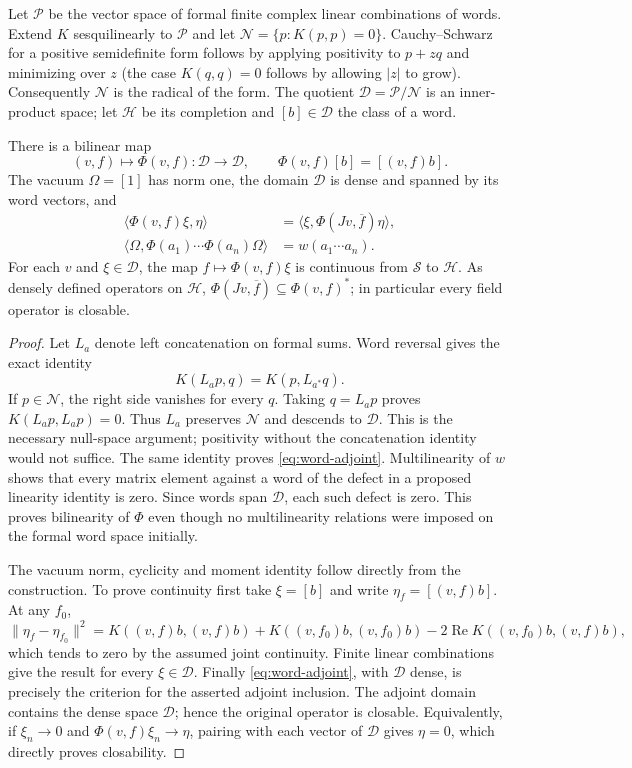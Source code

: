 Let $\mathcal P$ be the vector space of formal finite complex linear
combinations of words. Extend $K$ sesquilinearly to $\mathcal P$ and let
$\mathcal N=\{p:K(p,p)=0\}$. Cauchy--Schwarz for a positive semidefinite form
follows by applying positivity to $p+zq$ and minimizing over $z$ (the case
$K(q,q)=0$ follows by allowing $|z|$ to grow). Consequently
$\mathcal N$ is the radical of the form. The quotient
$\mathcal D=\mathcal P/\mathcal N$ is an inner-product space; let
$\mathcal H$ be its completion and $[b]\in\mathcal D$ the class of a word.

\begin{proposition}\label{prop:word-fields}
There is a bilinear map
\[
 (v,f)\longmapsto\Phi(v,f):\mathcal D\to\mathcal D,
 \qquad \Phi(v,f)[b]=[(v,f)b].
\]
The vacuum $\Omega=[1]$ has norm one, the domain $\mathcal D$ is dense and
spanned by its word vectors, and
\begin{align}
 \langle\Phi(v,f)\xi,\eta\rangle
   &=\langle\xi,\Phi(Jv,\overline f)\eta\rangle,
                       \label{eq:word-adjoint}\\
 \langle\Omega,\Phi(a_1)\cdots\Phi(a_n)\Omega\rangle
   &=w(a_1\cdots a_n).\nonumber
\end{align}
For each $v$ and $\xi\in\mathcal D$, the map
$f\mapsto\Phi(v,f)\xi$ is continuous from $\mathscr S$ to $\mathcal H$.
As densely defined operators on $\mathcal H$,
$\Phi(Jv,\overline f)\subseteq\Phi(v,f)^*$; in particular every field
operator is closable.
\end{proposition}
\begin{proof}
Let $L_a$ denote left concatenation on formal sums. Word reversal gives the
exact identity
\[
 K(L_ap,q)=K(p,L_{a^*}q).
\]
If $p\in\mathcal N$, the right side vanishes for every $q$. Taking
$q=L_ap$ proves $K(L_ap,L_ap)=0$. Thus $L_a$ preserves $\mathcal N$ and
descends to $\mathcal D$. This is the necessary null-space argument;
positivity without the concatenation identity would not suffice.
The same identity proves \eqref{eq:word-adjoint}. Multilinearity of $w$
shows that every matrix element against a word of the defect in a proposed
linearity identity is zero. Since words span $\mathcal D$, each such defect
is zero. This proves bilinearity of $\Phi$ even though no multilinearity
relations were imposed on the formal word space initially.

The vacuum norm, cyclicity and moment identity follow directly from the
construction. To prove continuity first take $\xi=[b]$ and write
$\eta_f=[(v,f)b]$. At any $f_0$,
\[
 \|\eta_f-\eta_{f_0}\|^2
 =K((v,f)b,(v,f)b)+K((v,f_0)b,(v,f_0)b)
  -2\operatorname{Re}K((v,f_0)b,(v,f)b),
\]
which tends to zero by the assumed joint continuity. Finite linear
combinations give the result for every $\xi\in\mathcal D$.
Finally \eqref{eq:word-adjoint}, with $\mathcal D$ dense, is precisely the
criterion for the asserted adjoint inclusion. The adjoint domain contains the
dense space $\mathcal D$; hence the original operator is closable. Equivalently,
if $\xi_n\to0$ and $\Phi(v,f)\xi_n\to\eta$, pairing with each vector of
$\mathcal D$ gives $\eta=0$, which directly proves closability.
\end{proof}

